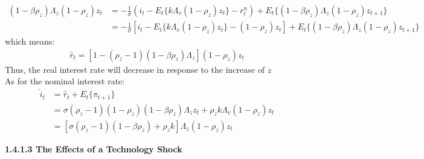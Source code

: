 \documentclass{article}
\numberwithin{equation}{section}
\begin{document}
	\begin{align*}
		(1 - \beta \rho_z)\Lambda_z (1 - \rho_z)z_t &= -\frac{1}{\sigma}(i_t - E_t\{k\Lambda_v (1 - \rho_z)z_t\} - r^n_t) + E_t\{(1 - \beta \rho_z)\Lambda_z (1 - \rho_z)z_{t+1}\}\\
		&= -\frac{1}{\sigma}[i_t - E_t\{k\Lambda_v (1 - \rho_z)z_t\} - (1 - \rho_z)z_t] + E_t\{(1 - \beta \rho_z)\Lambda_z (1 - \rho_z)z_{t+1}\}
	\end{align*} 
which means:
	\begin{align*}
		\hat{r}_t = [1 - (\rho_z - 1)(1 - \beta\rho_z)\Lambda_z](1 - \rho_z)z_t
	\end{align*}
Thus, the real interest rate will decrease in response to the increase of $z$\\
As for the nominal interest rate:
	\begin{align*}
		\hat{i}_t &= \hat{r}_t + E_t\{\pi_{t+1}\}\\
		&= \sigma (\rho_z - 1)(1 - \rho_z)(1 - \beta\rho_z)\Lambda_z z_t + \rho_zk\Lambda_v (1 - \rho_z)z_t\\
		&= [\sigma(\rho_z - 1)(1 - \beta\rho_z) + \rho_zk]\Lambda_z (1 - \rho_z)z_t
	\end{align*}
\centerline{\textbf{1.4.1.3 The Effects of a Technology Shock}}\\\\
\end{document}
